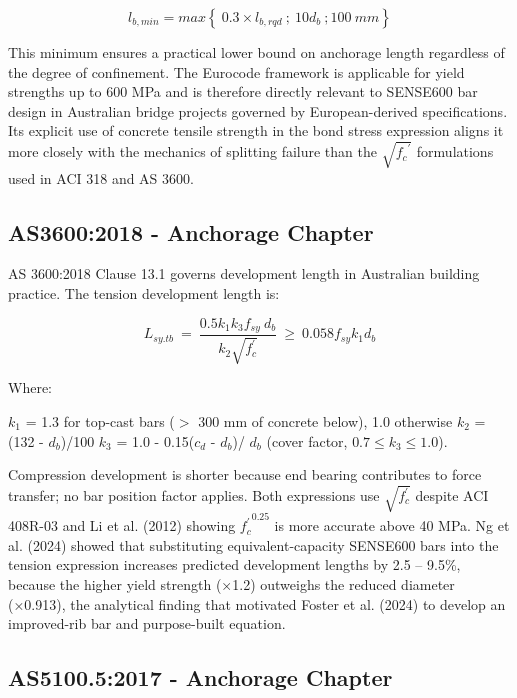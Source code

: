 \begin{equation}
    l_{b,min}=max \left\{\ 0.3\times l_{b,rqd}\ ; \ 10d_{b}\ ;100\ mm\right\}
\end{equation}

This minimum ensures a practical lower bound on anchorage length regardless of the degree of confinement. The Eurocode framework is applicable for yield strengths up to 600 MPa and is therefore directly relevant to SENSE600 bar design in Australian bridge projects governed by European-derived specifications. Its explicit use of concrete tensile strength in the bond stress expression aligns it more closely with the mechanics of splitting failure than the $\sqrt{{f_{c}}^{\prime }}$ formulations used in ACI 318 and AS 3600.

\subsection{AS3600:2018 - Anchorage Chapter}

AS 3600:2018 Clause 13.1 governs development length in Australian building practice. The tension development length is:

\begin{equation}
    L_{sy.tb}\ =\ \frac{0.5 k_{1} k_{3} f_{sy}\ d_{b}}{k_{2} \sqrt{f_{c}^{\prime }}}\ \geq \ 0.058 f_{sy}k_{1}d_{b}
\end{equation}

Where:

$k_{1}$ = 1.3 for top-cast bars ($>$ 300 mm of concrete below), 1.0 otherwise
$k_{2}$ = (132 - $d_{b}$)/100
$k_{3}$ = 1.0 - 0.15($c_{d}$ - $d_{b}$)/ $d_{b}$ (cover factor, $0.7 \leq k_{3} \leq 1.0$).

Compression development is shorter because end bearing contributes to force transfer; no bar position factor applies. Both expressions use $\sqrt{f_{c}^{\prime }}$  despite ACI 408R-03 and Li et al. (2012) showing ${f_{c}^{\prime }}^{0.25}$ is more accurate above 40 MPa. Ng et al. (2024) showed that substituting equivalent-capacity SENSE600 bars into the tension expression increases predicted development lengths by 2.5 – 9.5\%, because the higher yield strength (×1.2) outweighs the reduced diameter (×0.913), the analytical finding that motivated Foster et al. (2024) to develop an improved-rib bar and purpose-built equation.

\subsection{AS5100.5:2017 - Anchorage Chapter}

